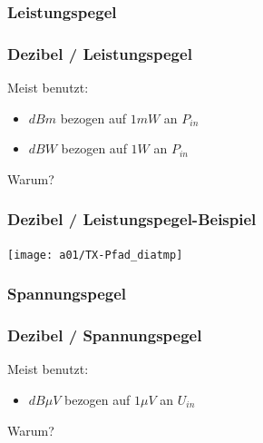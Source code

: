 \subsubsection{Leistungspegel}

\begin{frame}
    \frametitle{Dezibel / Leistungspegel}

    Meist benutzt:

    \begin{itemize}
        \item $dBm$ bezogen auf $1 mW$ an $P_{in}$
        \item $dBW$ bezogen auf $1 W$ an $P_{in}$
    \end{itemize}

    \begin{center}
        Warum?
    \end{center}


\end{frame}

\begin{frame}
    \frametitle{Dezibel / Leistungspegel-Beispiel}

    \texttt{[image: a01/TX-Pfad\_diatmp]}

    \vspace{3em}


\end{frame}

\subsubsection{Spannungspegel}

\begin{frame}
    \frametitle{Dezibel / Spannungspegel}

    Meist benutzt:

    \begin{itemize}
        \item $dB \mu V$ bezogen auf $1 \mu V$ an $U_{in}$
    \end{itemize}

    \begin{center}
        Warum?
    \end{center}


\end{frame}

